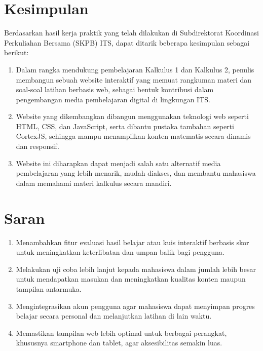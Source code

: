 \documentclass{file/KP-ITS}
\theoremstyle{definition}
\theoremstyle{definition}
\theoremstyle{plain}
\begin{document}
\section{Kesimpulan}
Berdasarkan hasil kerja praktik yang telah dilakukan di Subdirektorat Koordinasi Perkuliahan Bersama (SKPB) ITS, dapat ditarik beberapa kesimpulan sebagai berikut:
\begin{enumerate}
  \item Dalam rangka mendukung pembelajaran Kalkulus 1 dan Kalkulus 2, penulis membangun sebuah website interaktif yang memuat rangkuman materi dan soal-soal latihan berbasis web, sebagai bentuk kontribusi dalam pengembangan media pembelajaran digital di lingkungan ITS.
  \item Website yang dikembangkan dibangun menggunakan teknologi web seperti HTML, CSS, dan JavaScript, serta dibantu pustaka tambahan seperti CortexJS, sehingga mampu menampilkan konten matematis secara dinamis dan responsif.
  \item Website ini diharapkan dapat menjadi salah satu alternatif media pembelajaran yang lebih menarik, mudah diakses, dan membantu mahasiswa dalam memahami materi kalkulus secara mandiri.
\end{enumerate}
\section{Saran}
\begin{enumerate}
  \item Menambahkan fitur evaluasi hasil belajar atau kuis interaktif berbasis skor untuk meningkatkan keterlibatan dan umpan balik bagi pengguna.
  \item Melakukan uji coba lebih lanjut kepada mahasiswa dalam jumlah lebih besar untuk mendapatkan masukan dan meningkatkan kualitas konten maupun tampilan antarmuka.
  \item Mengintegrasikan akun pengguna agar mahasiswa dapat menyimpan progres belajar secara personal dan melanjutkan latihan di lain waktu.
  \item Memastikan tampilan web lebih optimal untuk berbagai perangkat, khususnya smartphone dan tablet, agar aksesibilitas semakin luas.
\end{enumerate}



\DaftarPustaka
\end{document}
